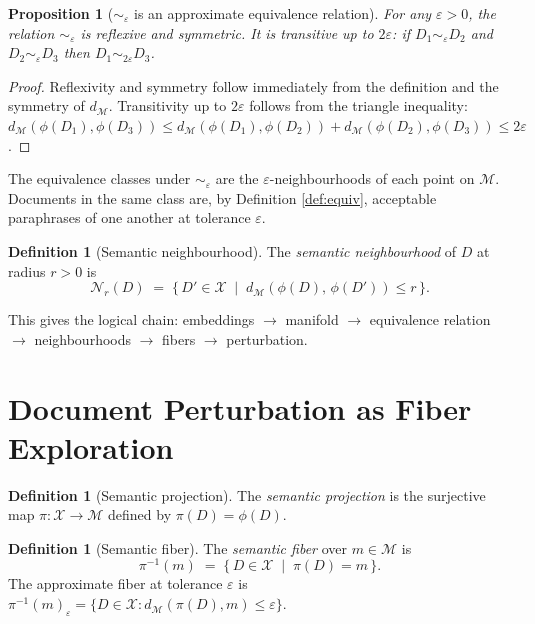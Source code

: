 \documentclass[12pt, a4paper]{article}
\theoremstyle{plain}
\newtheorem{proposition}[theorem]{Proposition}
\theoremstyle{definition}
\newtheorem{definition}[theorem]{Definition}
\theoremstyle{remark}
\newcommand{\calX}{\mathcal{X}}
\newcommand{\calM}{\mathcal{M}}
\newcommand{\vpi}{\pi}
\newcommand{\ve}{\varepsilon}
\newcommand{\dM}{d_{\calM}}
\newcommand{\fiber}[1]{\vpi^{-1}(#1)}
\begin{document}
\begin{proposition}[$\sim_\ve$ is an approximate equivalence relation]
\label{prop:equiv}
For any $\ve > 0$, the relation $\sim_\ve$ is reflexive and symmetric.  It is
transitive up to $2\ve$: if $D_1 \sim_\ve D_2$ and $D_2 \sim_\ve D_3$
then $D_1 \sim_{2\ve} D_3$.
\end{proposition}

\begin{proof}
Reflexivity and symmetry follow immediately from the definition and the
symmetry of $\dM$.  Transitivity up to $2\ve$ follows from the triangle
inequality: $\dM(\phi(D_1), \phi(D_3)) \le \dM(\phi(D_1), \phi(D_2)) +
\dM(\phi(D_2), \phi(D_3)) \le 2\ve$.
\end{proof}

The equivalence classes under $\sim_\ve$ are the $\ve$-neighbourhoods of each
point on $\calM$.  Documents in the same class are, by Definition
\ref{def:equiv}, acceptable paraphrases of one another at tolerance $\ve$.

\begin{definition}[Semantic neighbourhood]
\label{def:neighbourhood}
The \emph{semantic neighbourhood} of $D$ at radius $r > 0$ is
\[
   \mathcal{N}_r(D) \;=\; \bigl\{\, D' \in \calX \;\mid\;
   \dM(\phi(D),\, \phi(D')) \le r \,\bigr\}.
\]
\end{definition}

This gives the logical chain: embeddings $\to$ manifold $\to$ equivalence
relation $\to$ neighbourhoods $\to$ fibers $\to$ perturbation.


\section{Document Perturbation as Fiber Exploration}
\label{sec:fiber}

\begin{definition}[Semantic projection]
\label{def:projection}
The \emph{semantic projection} is the surjective map
$\vpi : \calX \to \calM$ defined by $\vpi(D) = \phi(D)$.
\end{definition}

\begin{definition}[Semantic fiber]
\label{def:fiber}
The \emph{semantic fiber} over $m \in \calM$ is
\[
   \fiber{m} \;=\; \bigl\{\, D \in \calX \;\mid\; \vpi(D) = m \,\bigr\}.
\]
The approximate fiber at tolerance $\ve$ is
$\fiber{m}_\ve = \{D \in \calX : \dM(\vpi(D), m) \le \ve\}$.
\end{definition}
\end{document}
